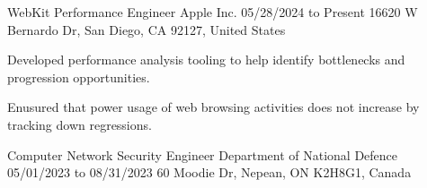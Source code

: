 

\begin{cventries}

  \cventry
    {WebKit Performance Engineer} %
    {Apple Inc.} %
    {05/28/2024 to Present} %
    {16620 W Bernardo Dr, San Diego, CA 92127, United States} %
    {
      \begin{cvitems} %
        \item{Developed performance analysis tooling to help identify  bottlenecks and progression opportunities.}
        \item{Enusured that power usage of web browsing activities does not increase by tracking down regressions.}
      \end{cvitems}
    }
  \cventry
    {Computer Network Security Engineer} %
    {Department of National Defence} %
    {05/01/2023 to 08/31/2023} %
    {60 Moodie Dr, Nepean, ON K2H8G1, Canada} %
    {
      \begin{cvitems} %

\end{cvitems}}
\end{cventries}
